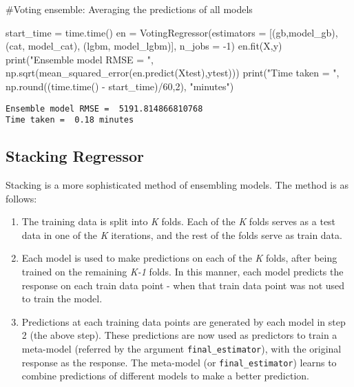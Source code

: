 \documentclass[
  letterpaper,
  DIV=11,
  numbers=noendperiod]{scrreprt}
\newenvironment{Shaded}{\begin{snugshade}}{\end{snugshade}}
\newcommand{\BuiltInTok}[1]{\textcolor[rgb]{0.00,0.23,0.31}{#1}}
\newcommand{\CommentTok}[1]{\textcolor[rgb]{0.37,0.37,0.37}{#1}}
\newcommand{\DecValTok}[1]{\textcolor[rgb]{0.68,0.00,0.00}{#1}}
\newcommand{\NormalTok}[1]{\textcolor[rgb]{0.00,0.23,0.31}{#1}}
\newcommand{\OperatorTok}[1]{\textcolor[rgb]{0.37,0.37,0.37}{#1}}
\newcommand{\StringTok}[1]{\textcolor[rgb]{0.13,0.47,0.30}{#1}}
\begin{document}
\begin{Shaded}
\begin{Highlighting}[]
\CommentTok{\#Voting ensemble: Averaging the predictions of all models}

\NormalTok{start\_time }\OperatorTok{=}\NormalTok{ time.time()}
\NormalTok{en }\OperatorTok{=}\NormalTok{ VotingRegressor(estimators }\OperatorTok{=}\NormalTok{ [(}\StringTok{\textquotesingle{}gb\textquotesingle{}}\NormalTok{,model\_gb), (}\StringTok{\textquotesingle{}cat\textquotesingle{}}\NormalTok{, model\_cat), (}\StringTok{\textquotesingle{}lgbm\textquotesingle{}}\NormalTok{, model\_lgbm)], n\_jobs }\OperatorTok{=} \OperatorTok{{-}}\DecValTok{1}\NormalTok{)}
\NormalTok{en.fit(X,y)}
\BuiltInTok{print}\NormalTok{(}\StringTok{"Ensemble model RMSE = "}\NormalTok{, np.sqrt(mean\_squared\_error(en.predict(Xtest),ytest)))}
\BuiltInTok{print}\NormalTok{(}\StringTok{"Time taken = "}\NormalTok{, np.}\BuiltInTok{round}\NormalTok{((time.time() }\OperatorTok{{-}}\NormalTok{ start\_time)}\OperatorTok{/}\DecValTok{60}\NormalTok{,}\DecValTok{2}\NormalTok{), }\StringTok{"minutes"}\NormalTok{)}
\end{Highlighting}
\end{Shaded}

\begin{verbatim}
Ensemble model RMSE =  5191.814866810768
Time taken =  0.18 minutes
\end{verbatim}

\subsection{Stacking Regressor}\label{stacking-regressor}

Stacking is a more sophisticated method of ensembling models. The method
is as follows:

\begin{enumerate}
\def\labelenumi{\arabic{enumi}.}
\item
  The training data is split into \emph{K} folds. Each of the \emph{K}
  folds serves as a test data in one of the \emph{K} iterations, and the
  rest of the folds serve as train data.
\item
  Each model is used to make predictions on each of the \emph{K} folds,
  after being trained on the remaining \emph{K-1} folds. In this manner,
  each model predicts the response on each train data point - when that
  train data point was not used to train the model.
\item
  Predictions at each training data points are generated by each model
  in step 2 (the above step). These predictions are now used as
  predictors to train a meta-model (referred by the argument
  \texttt{final\_estimator}), with the original response as the
  response. The meta-model (or \texttt{final\_estimator}) learns to
  combine predictions of different models to make a better prediction.
\end{enumerate}
\end{document}

